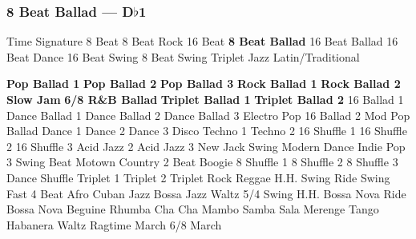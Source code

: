\subsubsection[8 Beat Ballad]{8 Beat Ballad --- \UiKey{\II}\UiKey{\MET}D$\flat$1}
Time Signature
8 Beat
8 Beat Rock
16 Beat
\textbf{8 Beat Ballad}
16 Beat Ballad
16 Beat Dance
16 Beat Swing
8 Beat Swing
Triplet
Jazz
Latin/Traditional





























\textbf{Pop Ballad 1}
\textbf{Pop Ballad 2}
\textbf{Pop Ballad 3}
\textbf{Rock Ballad 1}
\textbf{Rock Ballad 2}
\textbf{Slow Jam}
\textbf{6/8 R\&B Ballad}
\textbf{Triplet Ballad 1}
\textbf{Triplet Ballad 2}
16 Ballad 1
Dance Ballad 1
Dance Ballad 2
Dance Ballad 3
Electro Pop
16 Ballad 2
Mod Pop Ballad
Dance 1
Dance 2
Dance 3
Disco
Techno 1
Techno 2
16 Shuffle 1
16 Shuffle 2
16 Shuffle 3
Acid Jazz 2
Acid Jazz 3
New Jack Swing
Modern Dance
Indie Pop 3
Swing Beat
Motown
Country 2 Beat
Boogie
8 Shuffle 1
8 Shuffle 2
8 Shuffle 3
Dance Shuffle
Triplet 1
Triplet 2
Triplet Rock
Reggae
H.H. Swing
Ride Swing
Fast 4 Beat
Afro Cuban
Jazz Bossa
Jazz Waltz
5/4 Swing
H.H. Bossa Nova
Ride Bossa Nova
Beguine
Rhumba
Cha Cha
Mambo
Samba
Sala
Merenge
Tango
Habanera
Waltz
Ragtime
March
6/8 March
